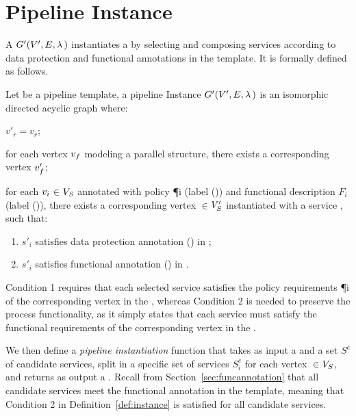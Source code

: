 \section{Pipeline Instance}\label{sec:instance}
A \pipelineInstance $G'(V',E,\lambda\,)$ instantiates a \pipelineTemplate \tChartFunction by selecting and composing services according to data protection and functional annotations in the template. It is formally defined as follows.
\vspace{0.5em}
\begin{definition}\label{def:instance}
  Let \tChartFunction be a pipeline template, a pipeline Instance $G'(V',E,\lambda\,)$ is an isomorphic directed acyclic graph where:
  \begin{enumerate*}[label=\textit{\roman*})]
    \item $v'_r$$=$$v_r$;
    \item for each vertex $v_{f}$ modeling a parallel structure, there exists a corresponding vertex $v'_{f}$;
    \item for each $v_{i}$$\in$$V_S$ annotated with policy \P{i} (label \myLambda()) and functional description $F_i$ (label \myGamma()), there exists a corresponding vertex $\in$$V'_S$ instantiated with a service , such that:
  \end{enumerate*}
  \begin{enumerate}[label=\arabic*)]
    \item $s'_i$ satisfies data protection annotation \myLambda() in \tChartFunction;
    \item $s'_i$ satisfies functional annotation \myGamma() in \tChartFunction.
  \end{enumerate}
\end{definition}
\vspace{0.5em}
Condition 1 requires that each selected service  satisfies the policy requirements \P{i} of the corresponding vertex  in the \pipelineTemplate, whereas Condition 2 is needed to preserve the process functionality, as it simply states that each service  must satisfy the functional requirements  of the corresponding vertex  in the \pipelineTemplate.

We then define a \emph{pipeline instantiation} function that takes as input a \pipelineTemplate \tChartFunction and a set $S^c$ of candidate services, split in a specific set of services $S^c_{i}$ for each vertex $\in$$V_S$, and returns as output a \pipelineInstance \iChartFunction. Recall from Section~\ref{sec:funcannotation} that all candidate services meet the functional annotation in the template, meaning that Condition 2 in Definition~\ref{def:instance} is satisfied for all candidate services.

